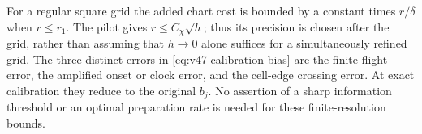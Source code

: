 For a regular square grid the added chart cost is bounded by a constant
times $r/\delta$ when $r\le r_1$.  The pilot gives $r\le C_\chi\sqrt h$;
thus its precision is chosen after the grid, rather than assuming that
$h\to0$ alone suffices for a simultaneously refined grid.
The three distinct errors in \eqref{eq:v47-calibration-bias} are the
finite-flight error, the amplified onset or clock error, and the cell-edge
crossing error.  At exact calibration they reduce to the original $b_j$.
No assertion of a sharp information threshold or an optimal preparation
rate is needed for these finite-resolution bounds.
